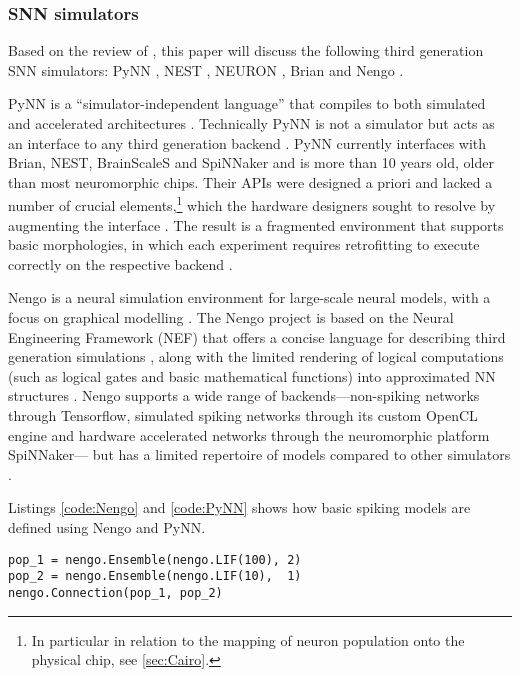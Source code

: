 \documentclass[report.tex]{subfiles}
\begin{document}
\subsubsection{\Gls{SNN} simulators} \label{sec:SNN-simulators}
Based on the review of \textcite{Blundell2018}, this paper will discuss
the following third generation \gls{SNN} simulators: PyNN \cite{Davison2009},
NEST \cite{Gewaltig2007}, NEURON \cite{Carnevale2007},
Brian \cite{Goodman2013} and Nengo \cite{Eliasmith2015}.

PyNN is a ``simulator-independent language''
\cite{PyNN2018} that compiles to both simulated and
accelerated architectures \cite{Davison2009}.
Technically PyNN is not a simulator but acts as an interface to any third generation
backend \cite{Davison2009}.
PyNN currently interfaces with Brian, NEST, BrainScaleS and SpiNNaker
and is more than 10 years old, \cite{Davison2009} older
than most neuromorphic chips. 
Their \gls{API}s were designed a priori and lacked a number of crucial
elements,\footnote{In particular in relation to the mapping of neuron population
onto the physical chip, see \ref{sec:Cairo}.} which the hardware designers sought
to resolve by augmenting the interface \cite{Pfeil2013, PyNN2018}.
The result is a fragmented environment that supports basic morphologies, 
in which each experiment requires retrofitting to execute correctly on the respective backend \cite{PyNN2018}.

Nengo is a neural simulation environment for large-scale neural models, with
a focus on graphical modelling \cite{Eliasmith2015}. 
The Nengo project is based on the Neural Engineering Framework (NEF)
 that offers a concise language for
describing third generation simulations \cite{Bekolay2014}, along with
the limited rendering of logical computations (such as logical gates and basic
mathematical functions) into approximated
\gls{NN} structures \cite{Eliasmith2004, Eliasmith2015}.
Nengo supports a wide range of backends---non-spiking networks through Tensorflow,
simulated spiking networks through its custom \gls{OpenCL} engine and 
hardware accelerated networks through the neuromorphic platform SpiNNaker---
but has a limited repertoire of models compared to other simulators
\cite{Nengo2018}.

Listings \ref{code:Nengo} and \ref{code:PyNN} shows how
basic spiking models are defined using Nengo and PyNN.

\begin{minipage}{\linewidth}
\begin{lstlisting}
pop_1 = nengo.Ensemble(nengo.LIF(100), 2)
pop_2 = nengo.Ensemble(nengo.LIF(10),  1)
nengo.Connection(pop_1, pop_2)
\end{lstlisting}
\end{minipage}
\end{document}
